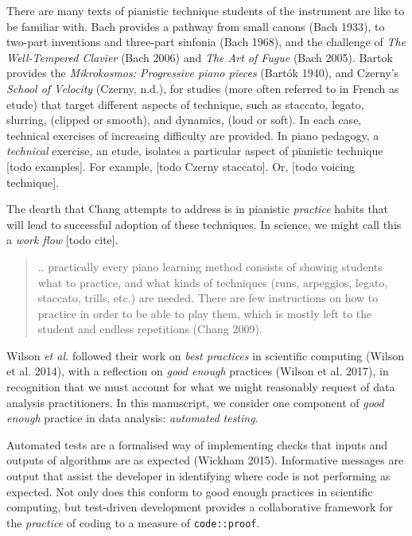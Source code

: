 \documentclass[
]{article}
\begin{document}
There are many texts of pianistic technique students of the instrument
are like to be familiar with. Bach provides a pathway from small canons
(Bach 1933), to two-part inventions and three-part sinfonia (Bach 1968),
and the challenge of \emph{The Well-Tempered Clavier} (Bach 2006) and
\emph{The Art of Fugue} (Bach 2005). Bartok provides the
\emph{Mikrokosmos: Progressive piano pieces} (Bartók 1940), and Czerny's
\emph{School of Velocity} (Czerny, n.d.), for studies (more often
referred to in French as etude) that target different aspects of
technique, such as staccato, legato, slurring, (clipped or smooth), and
dynamics, (loud or soft). In each case, technical exercises of
increasing difficulty are provided. In piano pedagogy, a
\emph{technical} exercise, an etude, isolates a particular aspect of
pianistic technique {[}todo examples{]}. For example, {[}todo Czerny
staccato{]}. Or, {[}todo voicing technique{]}.

The dearth that Chang attempts to address is in pianistic
\emph{practice} habits that will lead to successful adoption of these
techniques. In science, we might call this a \emph{work flow} {[}todo
cite{]}.

\begin{quote}
.. practically every piano learning method consists of showing students
what to practice, and what kinds of techniques (runs, arpeggios, legato,
staccato, trills, etc.) are needed. There are few instructions on how to
practice in order to be able to play them, which is mostly left to the
student and endless repetitions (Chang 2009).
\end{quote}

Wilson \emph{et al.} followed their work on \emph{best practices} in
scientific computing (Wilson et al. 2014), with a reflection on
\emph{good enough} practices (Wilson et al. 2017), in recognition that
we must account for what we might reasonably request of data analysis
practitioners. In this manuscript, we consider one component of
\emph{good enough} practice in data analysis: \emph{automated testing}.

Automated tests are a formalised way of implementing checks that inputs
and outputs of algorithms are as expected (Wickham 2015). Informative
messages are output that assist the developer in identifying where code
is not performing as expected. Not only does this conform to good enough
practices in scientific computing, but test-driven development provides
a collaborative framework for the \emph{practice} of coding to a measure
of \texttt{code::proof}.
\end{document}

